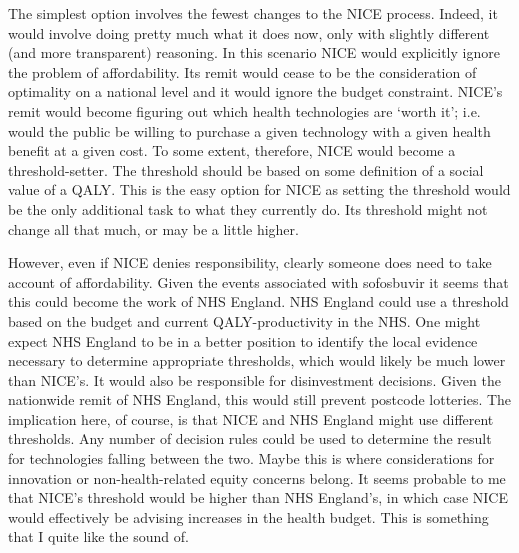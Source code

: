 The simplest option involves the fewest changes to the NICE process. Indeed, it would involve doing pretty much what it does now, only with slightly different (and more transparent) reasoning. In this scenario NICE would explicitly ignore the problem of affordability. Its remit would cease to be the consideration of optimality on a national level and it would ignore the budget constraint. NICE's remit would become figuring out which health technologies are `worth it'; i.e. would the public be willing to purchase a given technology with a given health benefit at a given cost. To some extent, therefore, NICE would become a threshold-setter. The threshold should be based on some definition of a social value of a QALY. This is the easy option for NICE as setting the threshold would be the only additional task to what they currently do. Its threshold might not change all that much\cite{Donaldson_2011}, or may be a little higher\cite{Bobinac_2012}.

However, even if NICE denies responsibility, clearly someone does need to take account of affordability. Given the events associated with sofosbuvir it seems that this could become the work of NHS England. NHS England could use a threshold based on the budget and current QALY-productivity in the NHS. One might expect NHS England to be in a better position to identify the local evidence necessary to determine appropriate thresholds\cite{Appleby_2009}, which would likely be much lower than NICE's\cite{claxton2013methods}. It would also be responsible for disinvestment decisions. Given the nationwide remit of NHS England, this would still prevent postcode lotteries. The implication here, of course, is that NICE and NHS England might use different thresholds. Any number of decision rules could be used to determine the result for technologies falling between the two. Maybe this is where considerations for innovation or non-health-related equity concerns belong. It seems probable to me that NICE's threshold would be higher than NHS England's, in which case NICE would effectively be advising increases in the health budget. This is something that I quite like the sound of.